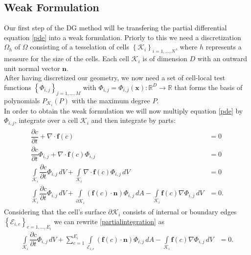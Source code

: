 		\subsection{Weak Formulation}
		Our first step of the DG method will be transfering the partial differential equation \eqref{pde} into a weak formulation.
		Priorly to this we need a discretization $\Omega_h$ of $\Omega$ consisting of a tesselation of cells $\left\{ \mathcal{K}_i \right\}_{i=1,...,N}$, where $h$ represents a measure for the size of the cells. Each cell $\mathcal{K}_i$ is of dimension $D$ with an outward unit normal vector $\boldsymbol{n}$. \\ \indent 
		After having discretized our geometry, we now need a set of cell-local test functions $\left\{\Phi_{i,j}\right\}_{j=1,...,M} $ with $\Phi_{i,j}=\Phi_{i,j}(\boldsymbol{x}):\mathbb{R}^D\rightarrow\mathbb{R}$ that forms the basis of polynomials $P_{\mathcal{K}_i}(P)$ with the maximum degree $P$. \\ \indent
		In order to obtain the weak formulation we will now multiply equation \eqref{pde} by $\Phi_{i,j}$, integrate over a cell $\mathcal{K}_i$ and then integrate by parts:	
		\begin{gather}	
			\begin{aligned}
			\dfrac{\partial c}{\partial t} + \nabla \cdot \boldsymbol{f}(c) &= 0 \\ 
			\dfrac{\partial c}{\partial t}\Phi_{i,j} + \nabla \cdot \boldsymbol{f}(c)\Phi_{i,j} &= 0 \\ 
			\int\limits_{\mathcal{K}_i} \dfrac{\partial c}{\partial t}\Phi_{i,j} \, dV + \int\limits_{\mathcal{K}_i}\nabla \cdot \boldsymbol{f}(c)\Phi_{i,j} \, dV &= 0\\ 
			\int\limits_{\mathcal{K}_i} \dfrac{\partial c}{\partial t}\Phi_{i,j} \, dV +
			\int\limits_{\partial \mathcal{K}_i} \left(\boldsymbol{f} \left( c \right) \cdot \boldsymbol{n} \right)\Phi_{i,j} \, dA
			- \int\limits_{\mathcal{K}_i} \boldsymbol{f}\left(c\right)\nabla\Phi_{i,j} \, dV &= 0.
			\label{partialintegration}
			\end{aligned}
		\end{gather}
		Considering that the cell's surface $\partial \mathcal{K}_i$ consists of internal or boundary edges $\left\{\mathcal{E}_{i,e}\right\}_{e = 1,...,E_i}$ we can rewrite \ref{partialintegration} as
		\begin{align}
				\int\limits_{\mathcal{K}_i} \dfrac{\partial c}{\partial t}\Phi_{i,j} \, dV +
				\sum_{e=1}^{E_i}\int\limits_{\mathcal{E}_{i,e}} \left(\boldsymbol{f} \left( c \right) \cdot \boldsymbol{n} \right)\Phi_{i,j} \, dA
				- \int\limits_{\mathcal{K}_i} \boldsymbol{f}\left(c\right)\nabla\Phi_{i,j} \, dV &= 0.
				\label{schwacheForm}
		\end{align}
